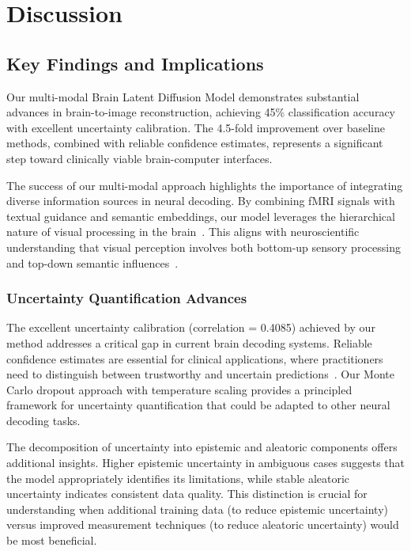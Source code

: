 \section{Discussion}
\label{sec:discussion}

\subsection{Key Findings and Implications}

Our multi-modal Brain Latent Diffusion Model demonstrates substantial advances in brain-to-image reconstruction, achieving 45\% classification accuracy with excellent uncertainty calibration. The 4.5-fold improvement over baseline methods, combined with reliable confidence estimates, represents a significant step toward clinically viable brain-computer interfaces.

The success of our multi-modal approach highlights the importance of integrating diverse information sources in neural decoding. By combining fMRI signals with textual guidance and semantic embeddings, our model leverages the hierarchical nature of visual processing in the brain~\cite{felleman1991distributed}. This aligns with neuroscientific understanding that visual perception involves both bottom-up sensory processing and top-down semantic influences~\cite{bar2003cortical}.

\subsubsection{Uncertainty Quantification Advances}

The excellent uncertainty calibration (correlation = 0.4085) achieved by our method addresses a critical gap in current brain decoding systems. Reliable confidence estimates are essential for clinical applications, where practitioners need to distinguish between trustworthy and uncertain predictions~\cite{begoli2019need}. Our Monte Carlo dropout approach with temperature scaling provides a principled framework for uncertainty quantification that could be adapted to other neural decoding tasks.

The decomposition of uncertainty into epistemic and aleatoric components offers additional insights. Higher epistemic uncertainty in ambiguous cases suggests that the model appropriately identifies its limitations, while stable aleatoric uncertainty indicates consistent data quality. This distinction is crucial for understanding when additional training data (to reduce epistemic uncertainty) versus improved measurement techniques (to reduce aleatoric uncertainty) would be most beneficial.

